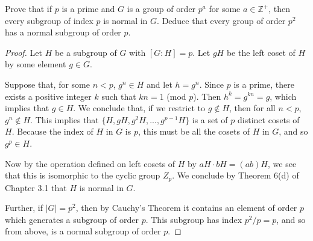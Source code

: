 \documentclass{article}
\begin{document}
Prove that if $p$ is a prime and $G$ is a group of order $p^a$ for some $a \in \mathbb{Z}^+$, then every subgroup of index $p$ is normal in $G$. Deduce that every group of order $p^2$ has a normal subgroup of order $p$.

\begin{proof}
    Let $H$ be a subgroup of $G$ with $[G:H] = p$. Let $gH$ be the left coset of $H$ by some element $g \in G$.
    
    Suppose that, for some $n < p$, $g^n \in H$ and let $h = g^n$. Since $p$ is a prime, there exists a positive integer $k$ such that $kn = 1$ (mod $p$). Then $h^k = g^{kn} = g$, which implies that $g \in H$. We conclude that, if we restrict to $g \notin H$, then for all $n < p$, $g^n \notin H$. This implies that $\{ H, gH, g^2 H, ..., g^{p - 1} H \}$ is a set of $p$ distinct cosets of $H$. Because the index of $H$ in $G$ is $p$, this must be all the cosets of $H$ in $G$, and so $g^p \in H$.

    Now by the operation defined on left cosets of $H$ by $aH \cdot bH = (ab)H$, we see that this is isomorphic to the cyclic group $Z_p$. We conclude by Theorem 6(d) of Chapter 3.1 that $H$ is normal in $G$.

    Further, if $|G| = p^2$, then by Cauchy's Theorem it contains an element of order $p$ which generates a subgroup of order $p$. This subgroup has index $p^2/p = p$, and so from above, is a normal subgroup of order $p$.
\end{proof}
\end{document}
